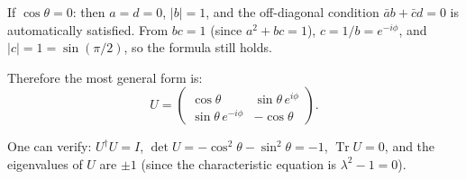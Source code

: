 \documentclass[12pt]{article}
\begin{document}
If $\cos\theta = 0$: then $a = d = 0$, $|b| = 1$, and the off-diagonal condition $\bar{a}b + \bar{c}d = 0$ is automatically satisfied. From $bc = 1$ (since $a^2 + bc = 1$), $c = 1/b = e^{-i\phi}$, and $|c| = 1 = \sin(\pi/2)$, so the formula still holds.

Therefore the most general form is:
\[
\boxed{U = \begin{pmatrix} \cos\theta & \sin\theta\, e^{i\phi} \\ \sin\theta\, e^{-i\phi} & -\cos\theta \end{pmatrix}.}
\]

One can verify: $U^\dagger U = I$, $\det U = -\cos^2\theta - \sin^2\theta = -1$, $\operatorname{Tr} U = 0$, and the eigenvalues of $U$ are $\pm 1$ (since the characteristic equation is $\lambda^2 - 1 = 0$).
\end{document}
